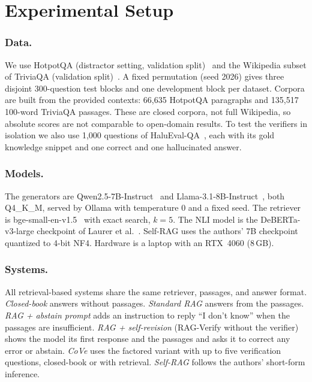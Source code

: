 \documentclass{svproc}
\begin{document}
\section{Experimental Setup}\label{sec:setup}
\subsubsection{Data.} We use HotpotQA (distractor setting, validation split)~\cite{yang2018hotpotqa} and the Wikipedia subset of TriviaQA (validation split)~\cite{joshi2017triviaqa}. A fixed permutation (seed 2026) gives three disjoint 300-question test blocks and one development block per dataset. Corpora are built from the provided contexts: 66{,}635 HotpotQA paragraphs and 135{,}517 100-word TriviaQA passages. These are closed corpora, not full Wikipedia, so absolute scores are not comparable to open-domain results. To test the verifiers in isolation we also use 1{,}000 questions of HaluEval-QA~\cite{li2023halueval}, each with its gold knowledge snippet and one correct and one hallucinated answer.

\subsubsection{Models.} The generators are Qwen2.5-7B-Instruct~\cite{qwen2024qwen25} and Llama-3.1-8B-Instruct~\cite{dubey2024llama3}, both Q4\_K\_M, served by Ollama with temperature 0 and a fixed seed. The retriever is bge-small-en-v1.5~\cite{xiao2023cpack} with exact search, $k=5$. The NLI model is the DeBERTa-v3-large checkpoint of Laurer et al.~\cite{laurer2023nli}. Self-RAG uses the authors' 7B checkpoint quantized to 4-bit NF4. Hardware is a laptop with an RTX~4060 (8\,GB).

\subsubsection{Systems.} All retrieval-based systems share the same retriever, passages, and answer format. \emph{Closed-book} answers without passages. \emph{Standard RAG} answers from the passages. \emph{RAG + abstain prompt} adds an instruction to reply ``I don't know'' when the passages are insufficient. \emph{RAG + self-revision} (RAG-Verify without the verifier) shows the model its first response and the passages and asks it to correct any error or abstain. \emph{CoVe} uses the factored variant with up to five verification questions, closed-book or with retrieval. \emph{Self-RAG} follows the authors' short-form inference.
\end{document}
